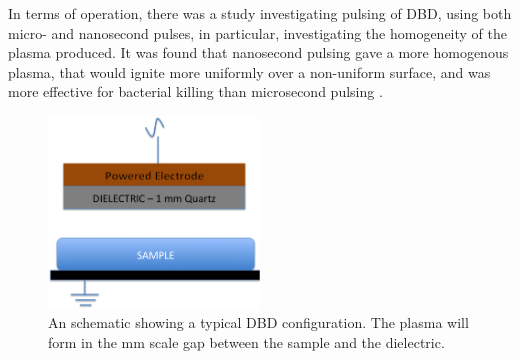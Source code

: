 \documentclass[11pt, oneside]{article}   	%
\newcommand{\todo}[1]{ \textcolor{red}{\bf{To Do:} #1}}
\begin{document}
In terms of operation, there was a study investigating pulsing of DBD, using both micro- and nanosecond pulses, in particular, investigating the homogeneity of the plasma produced. 
It was found that nanosecond pulsing gave a more homogenous plasma, that would ignite more uniformly over a non-uniform surface, and was more effective for bacterial killing than microsecond pulsing \cite{Ayan2009application, Ayan2008nanosecond}.







\begin{figure}
\centering
\includegraphics[width=0.5\textwidth]{Figures/DBD}
\caption{An schematic showing a typical DBD configuration. The plasma will form in the mm scale gap between the sample and the dielectric.}
\label{fig:DBD}
\end{figure}




\end{document}
